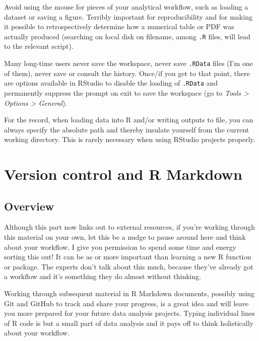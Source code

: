 \documentclass[
]{book}
\begin{document}
Avoid using the mouse for pieces of your analytical workflow, such as loading a dataset or saving a figure. Terribly important for reproducibility and for making it possible to retrospectively determine how a numerical table or PDF was actually produced (searching on local disk on filename, among \texttt{.R} files, will lead to the relevant script).

Many long-time users never save the workspace, never save \texttt{.RData} files (I'm one of them), never save or consult the history. Once/if you get to that point, there are options available in RStudio to disable the loading of \texttt{.RData} and permanently suppress the prompt on exit to save the workspace (go to \emph{Tools \textgreater{} Options \textgreater{} General}).

For the record, when loading data into R and/or writing outputs to file, you can always specify the absolute path and thereby insulate yourself from the current working directory. This is rarely necessary when using RStudio projects properly.

\hypertarget{part-version-control-and-r-markdown}{%
\part{Version control and R Markdown}\label{part-version-control-and-r-markdown}}

\hypertarget{overview}{%
\chapter*{Overview}\label{overview}}

Although this part now links out to external resources, if you're working through this material on your own, let this be a nudge to pause around here and think about your workflow. I give you permission to spend some time and energy sorting this out! It can be as or more important than learning a new R function or package. The experts don't talk about this much, because they've already got a workflow and it's something they do almost without thinking.

Working through subsequent material in R Markdown documents, possibly using Git and GitHub to track and share your progress, is a great idea and will leave you more prepared for your future data analysis projects. Typing individual lines of R code is but a small part of data analysis and it pays off to think holistically about your workflow.
\end{document}
